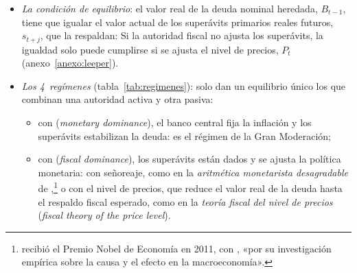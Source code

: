 \documentclass[11pt]{article}
\begin{document}
\begin{itemize}
\item \emph{La condición de equilibrio}: el valor real de la deuda nominal heredada, $B_{t-1}$, tiene que igualar el valor actual de los superávits primarios reales futuros, $s_{t+j}$, que la respaldan\nocite{LeeperLeith2016Understanding}:
  Si la autoridad fiscal no ajusta los superávits, la igualdad solo puede cumplirse si se ajusta el nivel de precios, $P_t$ (anexo~\ref{anexo:leeper}).
\item \emph{Los 4~regímenes} (tabla~\ref{tab:regimenes}): solo dan un equilibrio único los que combinan una autoridad activa y otra pasiva:
  \begin{itemize}
  \item con  (\emph{monetary dominance}), el banco central fija la inflación y los superávits estabilizan la deuda: es el régimen de la Gran Moderación;
  \item con  (\emph{fiscal dominance}), los superávits están dados y se ajusta la política monetaria: con señoreaje, como en la \emph{aritmética monetarista desagradable} de \textcite{SargentWallace1981Some},\footnote{ recibió el Premio Nobel de Economía en 2011, con , «por su investigación empírica sobre la causa y el efecto en la macroeconomía»\nocite{Nobel2011SargentSims}.} o con el nivel de precios, que reduce el valor real de la deuda hasta el respaldo fiscal esperado, como en la \emph{teoría fiscal del nivel de precios} (\emph{fiscal theory of the price level}).
  \end{itemize}
\end{itemize}
\end{document}
